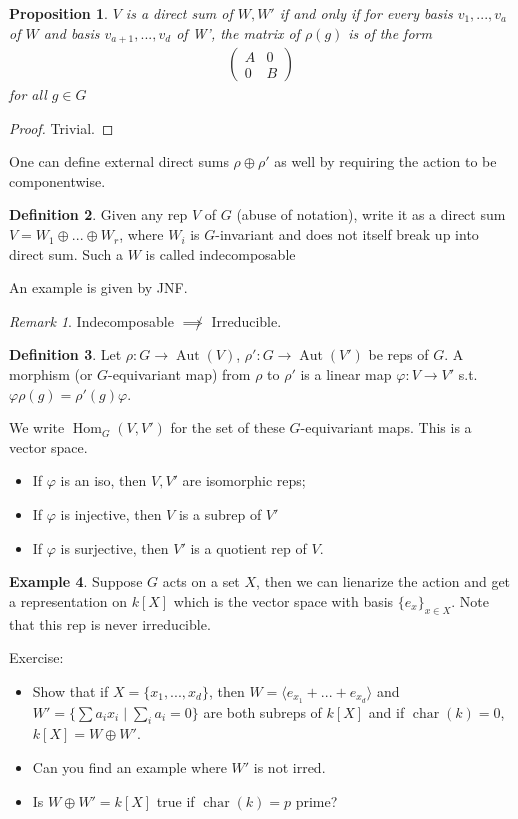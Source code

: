 \documentclass{article}
\theoremstyle{definition}
\newtheorem{defn}{Definition}[section]
\newtheorem{example}[defn]{Example}
\theoremstyle{remark}
\newtheorem{rem}{Remark}
\theoremstyle{plain}
\newtheorem{prop}[defn]{Proposition}
\begin{document}
 \begin{prop}
     $V$ is a direct sum of $W,W'$ if and only if for every basis $v_1,...,v_a$ of $W$ and basis $v_{a+1},...,v_{d}$ of W', the matrix of $\rho(g)$ is of the form
     \begin{align*}
         \begin{pmatrix}
             A&0\\0&B
         \end{pmatrix}
     \end{align*} for all $g\in G$
 \end{prop}
 \begin{proof}
     Trivial.
 \end{proof}
 One can define external direct sums $\rho\oplus\rho'$ as well by requiring the action to be componentwise.
 \begin{defn}
     Given any rep $V$ of $G$ (abuse of notation), write it as a direct sum $V=W_1\oplus...\oplus W_r$, where $W_i$ is $G$-invariant and does not itself break up into direct sum. Such a $W$ is called indecomposable
 \end{defn}
 An example is given by JNF.
 \begin{rem}
     Indecomposable $\not\implies$ Irreducible.
 \end{rem}
 \begin{defn}
     Let $\rho:G\to\operatorname{Aut}(V)$, $\rho':G\to\operatorname{Aut}(V')$ be reps of $G$. A morphism (or $G$-equivariant map) from $\rho$ to $\rho'$ is a linear map $\varphi:V\to V'$ s.t. $\varphi\rho(g)=\rho'(g)\varphi$.

     We write $\operatorname{Hom}_G(V,V')$ for the set of these $G$-equivariant maps. This is a vector space.
     \begin{itemize}
         \item If $\varphi$ is an iso, then $V,V'$ are isomorphic reps;
         \item If $\varphi$ is injective, then $V$ is a subrep of $V'$
         \item If $\varphi$ is surjective, then $V'$ is a quotient rep of $V$.
     \end{itemize}
 \end{defn}
 \begin{example}
     Suppose $G$ acts on a set $X$, then we can lienarize the action and get a representation on $k[X]$ which is the vector space with basis $\{e_x\}_{x\in X}$. Note that this rep is never irreducible.

     Exercise:
     \begin{itemize}
         \item Show that if $X=\{x_1,...,x_d\}$, then $W=\langle e_{x_1}+...+e_{x_d}\rangle$ and $W'=\{\sum a_ix_i\mid \sum_ia_i=0\}$ are both subreps of $k[X]$ and if $\operatorname{char}(k)=0$, $k[X]=W\oplus W'$.
         \item Can you find an example where $W'$ is not irred.
         \item Is $W\oplus W'=k[X]$ true if $\operatorname{char}(k)=p$ prime?
     \end{itemize}
 \end{example}
\end{document}
